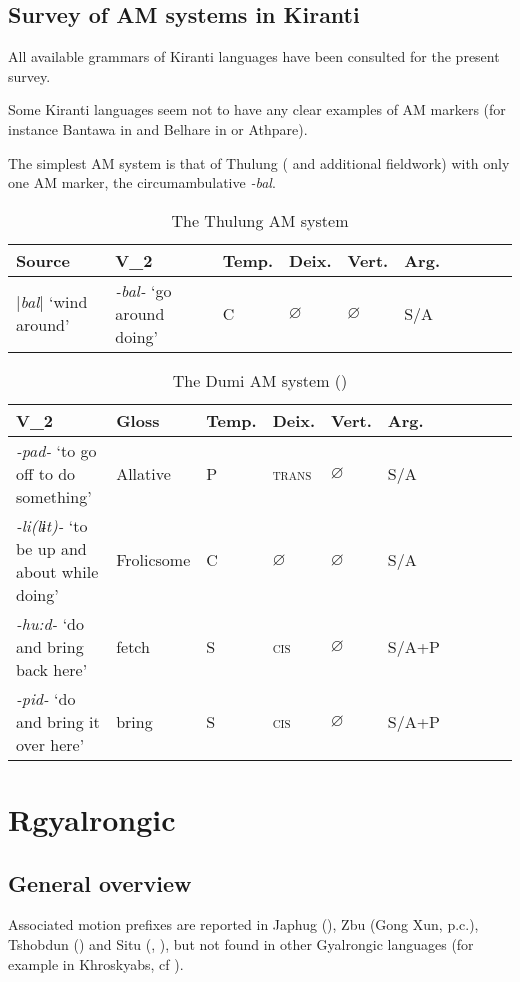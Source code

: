 \documentclass[oneside,a4paper,11pt]{article}
\newcommand{\ipa}[1]{{\phon\textit{#1}}}
\newcommand{\dhatu}[2]{|\ipa{#1}| `#2'}
\begin{document}
\subsection{Survey of AM systems in Kiranti}
All available grammars of Kiranti languages have been consulted for the present survey. 

Some Kiranti languages seem not to have any clear examples of AM markers (for instance Bantawa in \citealt{doornenbal09} and Belhare in \citealt{bickel97spatial} or Athpare).

The simplest AM system is that of Thulung (\citealt{lahaussois02thulung} and additional fieldwork) with only one AM marker, the circumambulative \ipa{-bal}.

\begin{table}
\caption{The Thulung AM system} \label{tab:thulung.am} \centering
\begin{tabular}{llllllllll}
\toprule
Source &V_2 & Temp.& Deix. & Vert.& Arg. \\
\midrule
\dhatu{bal}{wind around} &	\ipa{-bal-} `go around doing' &	C &		$\varnothing$ &$\varnothing$&	S/A & \\
\bottomrule
\end{tabular}
\end{table}						

\begin{table}
\caption{The Dumi AM system (\citealt[199-214]{driem93dumi})} \label{tab:dumi.am} \centering
\begin{tabular}{llllllllll}
\toprule
V_2 & Gloss& Temp.& Deix. & Vert.& Arg. \\
\midrule
\ipa{-pad-} `to go off to do something' &	Allative&P &		\textsc{trans} &$\varnothing$&	S/A & \\
\ipa{-li(lɨt)-} `to be up and about while doing' &	Frolicsome&C &		$\varnothing$ &$\varnothing$&	S/A & \\
\ipa{-hu:d-} `do and bring back here' &	fetch&S &		\textsc{cis} &$\varnothing$&	S/A+P & \\
\ipa{-pid-} `do and bring it over here' &	bring&S &		\textsc{cis} &$\varnothing$&	S/A+P & \\
\bottomrule
\end{tabular}
\end{table}				

\section{Rgyalrongic}

\subsection{General overview}
Associated motion prefixes are reported in Japhug (\citealt{jacques13harmonization}), Zbu (Gong Xun, p.c.), Tshobdun (\citealt{jackson14morpho}) and Situ (\citealt[200-204]{zhang16bragdbar}, \citealt[497-500]{prins16kyomkyo}), but not found in other Gyalrongic languages (for example in Khroskyabs, cf \citealt{lai17khroskyabs}).
\end{document}
